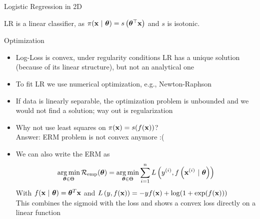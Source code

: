\documentclass[11pt,compress,t,notes=noshow, xcolor=table]{beamer}
\begin{document}
\begin{vbframe}{Logistic Regression in 2D}

LR is a linear classifier, as $\pi(\mathbf{x}~|~ \bm{\theta}) = s\left( \bm{\theta}^\top \mathbf{x} \right)$ 
and $s$ is isotonic.

\lz\lz


\end{vbframe}


\begin{vbframe}{Optimization}

\begin{itemize}

\item Log-Loss is convex, under regularity conditions LR has a unique solution (because of its linear structure), but not an analytical one

\item To fit LR we use numerical optimization, e.g., Newton-Raphson

\item If data is linearly separable, the optimization problem is unbounded and we would not find a solution; way out is regularization 

\item Why not use least squares on $\pi(\mathbf{x}) = s(f(\mathbf{x}))$? \\
Answer: ERM problem is not convex anymore :(

\item We can also write the ERM as  
$$
\mathop{\mathrm{arg\,min}}_{\bm{\theta} \in \Theta} \mathcal{R}_{\text{emp}}(\bm{\theta}) = \mathop{\mathrm{arg\,min}}_{\bm{\theta} \in \Theta} \sum\limits_{i=1}^n L\left(y^{(i)}, f\left(\mathbf{x}^{(i)} ~|~ \bm{\theta}\right)\right)
$$
With $f(\mathbf{x} ~|~ \bm{\theta}) = \bm{\theta}^T \mathbf{x}$ and 
$L\left(y, f(\mathbf{x})\right) = -y f(\mathbf{x}) + \log(1 + \exp(f(\mathbf{x}))) $\\
\lz
This combines the sigmoid with the loss and shows a convex loss directly on a linear function
\end{itemize}
\end{vbframe}



\endlecture
\end{document}
